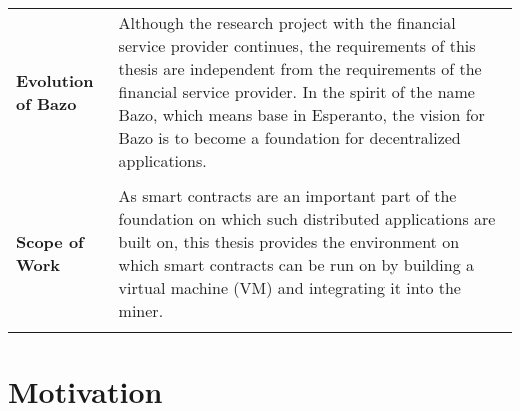 \begin{tabular}[t]{ p{3cm} p{12.5cm}}
\raggedright
\textbf{Evolution of Bazo} &
Although the research project with the financial service provider continues, the requirements of this thesis are independent from the requirements of the financial service provider. In the spirit of the name Bazo, which means base in Esperanto, the vision for Bazo is to become a foundation for decentralized applications. \\ \\

\raggedright
\textbf{Scope of Work} &
As smart contracts are an important part of the foundation on which such distributed applications are built on, this thesis provides the environment on which smart contracts can be run on by building a virtual machine (VM) and integrating it into the miner. \\ \\
\end{tabular}
\pagebreak

\section{Motivation}


